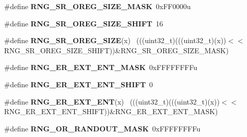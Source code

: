 \begin{DoxyCompactItemize}
\item 
\hypertarget{group___r_n_g___register___masks_ga2f35d6883145b930c34d949640694a6f}{}\#define {\bfseries R\+N\+G\+\_\+\+S\+R\+\_\+\+O\+R\+E\+G\+\_\+\+S\+I\+Z\+E\+\_\+\+M\+A\+S\+K}~0x\+F\+F0000u\label{group___r_n_g___register___masks_ga2f35d6883145b930c34d949640694a6f}

\item 
\hypertarget{group___r_n_g___register___masks_ga7bd0f51640dd8184fdc95b687473e7d6}{}\#define {\bfseries R\+N\+G\+\_\+\+S\+R\+\_\+\+O\+R\+E\+G\+\_\+\+S\+I\+Z\+E\+\_\+\+S\+H\+I\+F\+T}~16\label{group___r_n_g___register___masks_ga7bd0f51640dd8184fdc95b687473e7d6}

\item 
\hypertarget{group___r_n_g___register___masks_ga81fb6d7ef35f9104a19de09e526bb5a2}{}\#define {\bfseries R\+N\+G\+\_\+\+S\+R\+\_\+\+O\+R\+E\+G\+\_\+\+S\+I\+Z\+E}(x)                                        ~(((uint32\+\_\+t)(((uint32\+\_\+t)(x))$<$$<$R\+N\+G\+\_\+\+S\+R\+\_\+\+O\+R\+E\+G\+\_\+\+S\+I\+Z\+E\+\_\+\+S\+H\+I\+F\+T))\&R\+N\+G\+\_\+\+S\+R\+\_\+\+O\+R\+E\+G\+\_\+\+S\+I\+Z\+E\+\_\+\+M\+A\+S\+K)\label{group___r_n_g___register___masks_ga81fb6d7ef35f9104a19de09e526bb5a2}

\item 
\hypertarget{group___r_n_g___register___masks_gab27d57cff82acd0615707b3a53c7cce0}{}\#define {\bfseries R\+N\+G\+\_\+\+E\+R\+\_\+\+E\+X\+T\+\_\+\+E\+N\+T\+\_\+\+M\+A\+S\+K}~0x\+F\+F\+F\+F\+F\+F\+F\+Fu\label{group___r_n_g___register___masks_gab27d57cff82acd0615707b3a53c7cce0}

\item 
\hypertarget{group___r_n_g___register___masks_gae01cc719557411c3218c33e4b855b790}{}\#define {\bfseries R\+N\+G\+\_\+\+E\+R\+\_\+\+E\+X\+T\+\_\+\+E\+N\+T\+\_\+\+S\+H\+I\+F\+T}~0\label{group___r_n_g___register___masks_gae01cc719557411c3218c33e4b855b790}

\item 
\hypertarget{group___r_n_g___register___masks_ga973388c70ea5eeab82fdafad8362a66a}{}\#define {\bfseries R\+N\+G\+\_\+\+E\+R\+\_\+\+E\+X\+T\+\_\+\+E\+N\+T}(x)                                            ~(((uint32\+\_\+t)(((uint32\+\_\+t)(x))$<$$<$R\+N\+G\+\_\+\+E\+R\+\_\+\+E\+X\+T\+\_\+\+E\+N\+T\+\_\+\+S\+H\+I\+F\+T))\&R\+N\+G\+\_\+\+E\+R\+\_\+\+E\+X\+T\+\_\+\+E\+N\+T\+\_\+\+M\+A\+S\+K)\label{group___r_n_g___register___masks_ga973388c70ea5eeab82fdafad8362a66a}

\item 
\hypertarget{group___r_n_g___register___masks_gaa29938490b0cc9d23a54a137c62ba64a}{}\#define {\bfseries R\+N\+G\+\_\+\+O\+R\+\_\+\+R\+A\+N\+D\+O\+U\+T\+\_\+\+M\+A\+S\+K}~0x\+F\+F\+F\+F\+F\+F\+F\+Fu\label{group___r_n_g___register___masks_gaa29938490b0cc9d23a54a137c62ba64a}


\end{DoxyCompactItemize}
